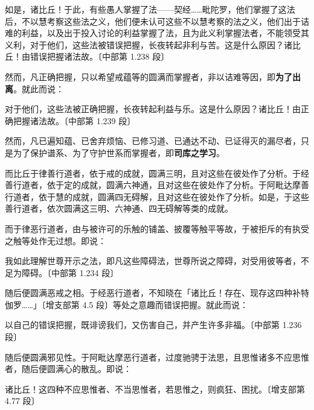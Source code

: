 \begin{quoting}如是，诸比丘！于此，有些愚人掌握了法——契经……毗陀罗，他们掌握了这法后，不以慧考察这些法之义，他们便未认可这些不以慧考察的法之义，他们出于诘难的利益，以及出于投入讨论的利益掌握了法，且为此义利掌握法者，不能领受其义利，对于他们，这些法被错误把握，长夜转起非利与苦。这是什么原因？诸比丘！由错误把握诸法故。{\bluefootnotesize 〔中部第 1.238 段〕}\end{quoting}

然而，凡正确把握，只以希望戒蕴等的圆满而掌握者，非以诘难等因，即\textbf{为了出离}。就此而说：

\begin{quoting}对于他们，这些法被正确把握，长夜转起利益与乐。这是什么原因？诸比丘！由正确把握诸法故。{\bluefootnotesize 〔中部第 1.239 段〕}\end{quoting}

然而，凡已遍知蕴、已舍弃烦恼、已修习道、已通达不动、已证得灭的漏尽者，只是为了保护谱系、为了守护世系而掌握者，即\textbf{司库之学习}。

而比丘于律善行道者，依于戒的成就，圆满三明，且对这些在彼处作了分析。于经善行道者，依于定的成就，圆满六神通，且对这些在彼处作了分析。于阿毗达摩善行道者，依于慧的成就，圆满四无碍解，且对这些在彼处作了分析。如是，于这些善行道者，依次圆满这三明、六神通、四无碍解等类的成就。

而于律恶行道者，由与被许可的乐触的铺盖、披覆等触平等故，于被拒斥的有执受之触等处作无过想。即说：

\begin{quoting}我如此理解世尊开示之法，即凡这些障碍法，世尊所说之障碍，对受用彼等者，不足为障碍。{\bluefootnotesize 〔中部第 1.234 段〕}\end{quoting}

随后便圆满恶戒之相。于经恶行道者，不知晓在「诸比丘！存在、现存这四种补特伽罗……」{\bluefootnotesize 〔增支部第 4.5 段〕}等处之意趣而错误把握。就此而说：

\begin{quoting}以自己的错误把握，既诽谤我们，又伤害自己，并产生许多非福。{\bluefootnotesize 〔中部第 1.236 段〕}\end{quoting}

随后便圆满邪见性。于阿毗达摩恶行道者，过度驰骋于法思，且思惟诸多不应思惟者，随后便圆满心的散乱。即说：

\begin{quoting}诸比丘！这四种不应思惟者、不当思惟者，若思惟之，则疯狂、困扰。{\bluefootnotesize 〔增支部第 4.77 段〕}\end{quoting}

